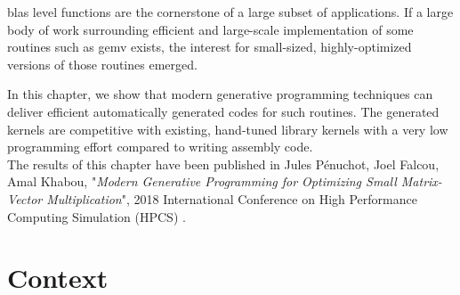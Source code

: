 \documentclass[../main]{subfiles}
\begin{document}
\gls{blas} level functions\cite{blas} are the cornerstone of a large
subset of applications. If a large body of work surrounding
efficient and large-scale implementation of some routines such
as \gls{gemv} exists, the interest for small-sized, highly-optimized
versions of those routines emerged.

In this chapter, we show that modern \cpp generative
programming techniques can deliver efficient automatically
generated codes for such routines.
The generated kernels are competitive with existing,
hand-tuned library kernels with a very low programming effort
compared to writing assembly code.
\\

The results of this chapter have been published in
Jules P\'enuchot, Joel Falcou, Amal Khabou,
"\textit{Modern Generative Programming for Optimizing Small Matrix-Vector
Multiplication}",
2018 International Conference on High Performance Computing Simulation (HPCS)
\cite{hpcs2018-matvec}.

\section{
  Context
}
\end{document}
